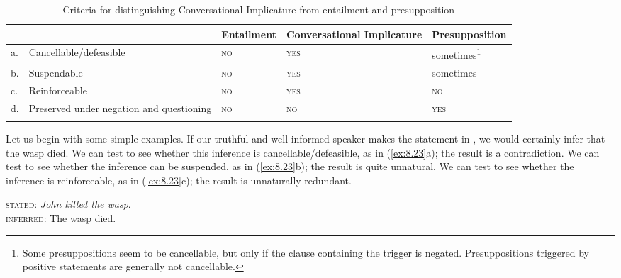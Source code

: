 \begin{table}
\caption{Criteria for distinguishing Conversational Implicature from entailment and presupposition}
\label{extab:8.22}

\begin{tabularx}{\textwidth}{lQQQQ}
\lsptoprule
&  & Entailment & Conversational Implicature & Presupposition\\
\midrule
a. & Cancellable\slash defeasible & \scshape no & \scshape yes & sometimes\footnote{Some presuppositions seem to be cancellable, but only if the clause containing the trigger is negated. Presuppositions triggered by positive statements are generally not cancellable.}\\
b. & Suspendable & \scshape no & \scshape yes & sometimes\\
c. & Reinforceable & \scshape no & \scshape yes & \scshape no\\
d. & Preserved under negation and questioning & \scshape no & \scshape no & \scshape yes\\
\lspbottomrule
\end{tabularx}
\end{table}


Let us begin with some simple examples. If our truthful and well-informed speaker makes the statement in , we would certainly infer that the wasp died. We can test to see whether this inference is cancellable/defeasible, as in (\ref{ex:8.23}a); the result is a contradiction. We can test to see whether the inference can be suspended, as in (\ref{ex:8.23}b); the result is quite unnatural. We can test to see whether the inference is reinforceable, as in (\ref{ex:8.23}c); the result is unnaturally redundant.

\ea \label{ex:8.23}
\textsc{stated}: \textit{John killed the wasp}.\\
\textsc{inferred}: The wasp died.\\




                       \z
\z

\judgewidth{*}

